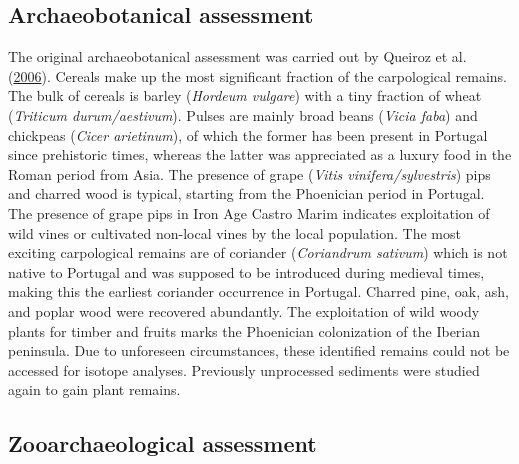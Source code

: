 \documentclass[3p]{elsarticle} %
\begin{document}
\hypertarget{archaeobotanical-assessment}{%
\subsection{Archaeobotanical assessment}\label{archaeobotanical-assessment}}

The original archaeobotanical assessment was carried out by Queiroz et al. (\protect\hyperlink{ref-queiroz_etal06}{2006}). Cereals make up the most significant fraction of the carpological remains. The bulk of cereals is barley (\emph{Hordeum vulgare}) with a tiny fraction of wheat (\emph{Triticum durum/aestivum}). Pulses are mainly broad beans (\emph{Vicia faba}) and chickpeas (\emph{Cicer arietinum}), of which the former has been present in Portugal since prehistoric times, whereas the latter was appreciated as a luxury food in the Roman period from Asia. The presence of grape (\emph{Vitis vinifera/sylvestris}) pips and charred wood is typical, starting from the Phoenician period in Portugal. The presence of grape pips in Iron Age Castro Marim indicates exploitation of wild vines or cultivated non-local vines by the local population. The most exciting carpological remains are of coriander (\emph{Coriandrum sativum}) which is not native to Portugal and was supposed to be introduced during medieval times, making this the earliest coriander occurrence in Portugal. Charred pine, oak, ash, and poplar wood were recovered abundantly. The exploitation of wild woody plants for timber and fruits marks the Phoenician colonization of the Iberian peninsula. Due to unforeseen circumstances, these identified remains could not be accessed for isotope analyses. Previously unprocessed sediments were studied again to gain plant remains.

\hypertarget{zooarchaeological-assessment}{%
\subsection{Zooarchaeological assessment}\label{zooarchaeological-assessment}}
\end{document}
